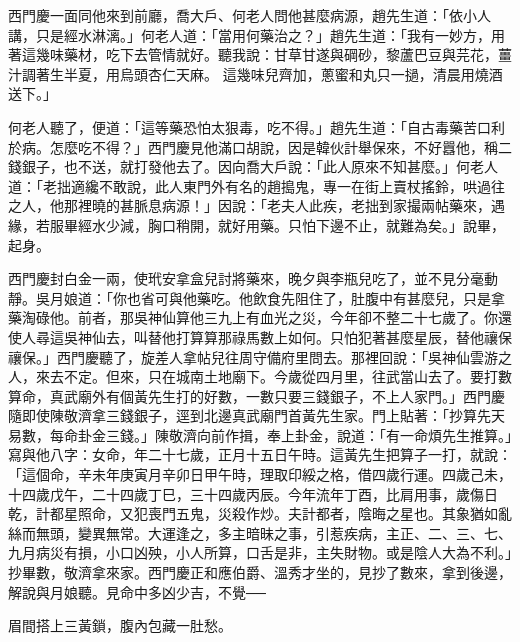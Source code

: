 西門慶一面同他來到前廳，喬大戶、何老人問他甚麼病源，趙先生道：「依小人講，只是經水淋漓。」何老人道：「當用何藥治之？」趙先生道：「我有一妙方，用著這幾味藥材，吃下去管情就好。聽我說：甘草甘遂與碙砂，黎蘆巴豆與芫花，薑汁調著生半夏，用烏頭杏仁天麻。 這幾味兒齊加，蔥蜜和丸只一撾，清晨用燒酒送下。」

何老人聽了，便道：「這等藥恐怕太狠毒，吃不得。」趙先生道：「自古毒藥苦口利於病。怎麼吃不得？」西門慶見他滿口胡說，因是韓伙計舉保來，不好囂他，稱二錢銀子，也不送，就打發他去了。因向喬大戶說：「此人原來不知甚麼。」何老人道：「老拙適纔不敢說，此人東門外有名的趙搗鬼，專一在街上賣杖搖鈴，哄過往之人，他那裡曉的甚脈息病源！」因說：「老夫人此疾，老拙到家撮兩帖藥來，遇緣，若服畢經水少減，胸口稍開，就好用藥。只怕下邊不止，就難為矣。」說畢，起身。

西門慶封白金一兩，使玳安拿盒兒討將藥來，晚夕與李瓶兒吃了，並不見分毫動靜。吳月娘道：「你也省可與他藥吃。他飲食先阻住了，肚腹中有甚麼兒，只是拿藥淘碌他。前者，那吳神仙算他三九上有血光之災，今年卻不整二十七歲了。你還使人尋這吳神仙去，叫替他打算算那祿馬數上如何。只怕犯著甚麼星辰，替他禳保禳保。」西門慶聽了，旋差人拿帖兒往周守備府里問去。那裡回說：「吳神仙雲游之人，來去不定。但來，只在城南土地廟下。今歲從四月里，往武當山去了。要打數算命，真武廟外有個黃先生打的好數，一數只要三錢銀子，不上人家門。」西門慶隨即使陳敬濟拿三錢銀子，逕到北邊真武廟門首黃先生家。門上貼著：「抄算先天易數，每命卦金三錢。」陳敬濟向前作揖，奉上卦金，說道：「有一命煩先生推算。」寫與他八字：女命，年二十七歲，正月十五日午時。這黃先生把算子一打，就說：「這個命，辛未年庚寅月辛卯日甲午時，理取印綏之格，借四歲行運。四歲己未，十四歲戊午，二十四歲丁巳，三十四歲丙辰。今年流年丁酉，比肩用事，歲傷日乾，計都星照命，又犯喪門五鬼，災殺作炒。夫計都者，陰晦之星也。其象猶如亂絲而無頭，變異無常。大運逢之，多主暗昧之事，引惹疾病，主正、二、三、七、九月病災有損，小口凶殃，小人所算，口舌是非，主失財物。或是陰人大為不利。」抄畢數，敬濟拿來家。西門慶正和應伯爵、溫秀才坐的，見抄了數來，拿到後邊，解說與月娘聽。見命中多凶少吉，不覺──

眉間搭上三黃鎖，腹內包藏一肚愁。

